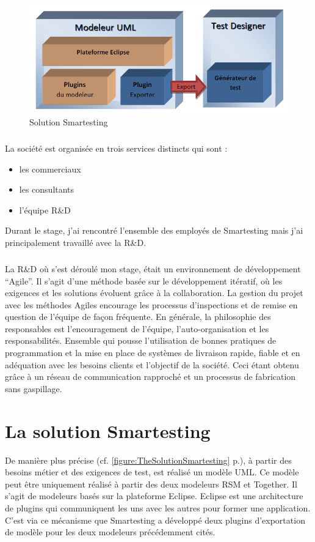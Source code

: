 \begin{figure}[!ht]
\begin{center}
  \includegraphics[width=.7\textwidth]{images/TestDesigner.png}
  \caption{Solution Smartesting}
  \label{SolutionSmartesting}
\end{center}
\end{figure}

\subparagraph*{}
La société est organisée en trois services distincts qui sont :
\begin{itemize}
  \item les commerciaux
  \item les consultants
  \item l'équipe R\&D
\end{itemize}
 Durant le stage, j'ai rencontré l'ensemble des employés de Smartesting mais j'ai principalement travaillé avec la R\&D.

\subparagraph*{}
La R\&D où s'est déroulé mon stage, était un environnement de développement ``Agile''. 
Il s'agit d'une méthode basée sur le développement itératif, où les exigences et les solutions évoluent grâce à la collaboration. 
La gestion du projet avec les méthodes Agiles encourage les processus d'inspections et de remise en question de l'équipe de façon fréquente. 
En générale, la philosophie des responsables est l'encouragement de l'équipe, l'auto-organisation et les responsabilités. 
Ensemble qui pousse l'utilisation de bonnes pratiques de programmation et la mise en place de systèmes de livraison rapide, fiable et en adéquation avec les besoins clients et l'objectif de la société.
Ceci étant obtenu grâce à un réseau de communication rapproché et un processus de fabrication sans gaspillage.

\section{La solution Smartesting}

De manière plus précise (cf. \ref{figure:TheSolutionSmartesting} p.\pageref{figure:TheSolutionSmartesting}), à partir des besoins métier et des exigences de test, est réalisé un modèle UML.
Ce modèle peut être uniquement réalisé à partir des deux modeleurs RSM et Together.
Il s'agit de modeleurs basés sur la plateforme Eclipse. Eclipse est une architecture de plugins qui communiquent les uns avec les autres pour former une application. C'est via ce mécanisme que Smartesting a développé deux plugins d'exportation de modèle pour les deux modeleurs précédemment cités.

